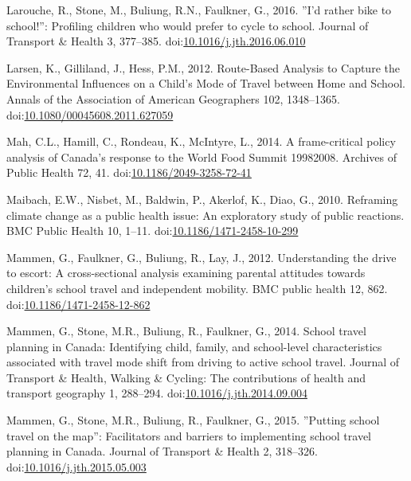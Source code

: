 \documentclass[]{elsarticle} %
\begin{document}
\leavevmode\hypertarget{ref-laroucheRatherBikeSchool2016}{}%
Larouche, R., Stone, M., Buliung, R.N., Faulkner, G., 2016. ''I'd rather
bike to school!'': Profiling children who would prefer to cycle to
school. Journal of Transport \& Health 3, 377--385.
doi:\href{https://doi.org/10.1016/j.jth.2016.06.010}{10.1016/j.jth.2016.06.010}

\leavevmode\hypertarget{ref-larsenRouteBasedAnalysisCapture2012}{}%
Larsen, K., Gilliland, J., Hess, P.M., 2012. Route-Based Analysis to
Capture the Environmental Influences on a Child's Mode of Travel between
Home and School. Annals of the Association of American Geographers 102,
1348--1365.
doi:\href{https://doi.org/10.1080/00045608.2011.627059}{10.1080/00045608.2011.627059}

\leavevmode\hypertarget{ref-mahFramecriticalPolicyAnalysis2014}{}%
Mah, C.L., Hamill, C., Rondeau, K., McIntyre, L., 2014. A frame-critical
policy analysis of Canada's response to the World Food Summit 19982008.
Archives of Public Health 72, 41.
doi:\href{https://doi.org/10.1186/2049-3258-72-41}{10.1186/2049-3258-72-41}

\leavevmode\hypertarget{ref-maibachReframingClimateChange2010}{}%
Maibach, E.W., Nisbet, M., Baldwin, P., Akerlof, K., Diao, G., 2010.
Reframing climate change as a public health issue: An exploratory study
of public reactions. BMC Public Health 10, 1--11.
doi:\href{https://doi.org/10.1186/1471-2458-10-299}{10.1186/1471-2458-10-299}

\leavevmode\hypertarget{ref-mammenUnderstandingDriveEscort2012}{}%
Mammen, G., Faulkner, G., Buliung, R., Lay, J., 2012. Understanding the
drive to escort: A cross-sectional analysis examining parental attitudes
towards children's school travel and independent mobility. BMC public
health 12, 862.
doi:\href{https://doi.org/10.1186/1471-2458-12-862}{10.1186/1471-2458-12-862}

\leavevmode\hypertarget{ref-mammenSchoolTravelPlanning2014}{}%
Mammen, G., Stone, M.R., Buliung, R., Faulkner, G., 2014. School travel
planning in Canada: Identifying child, family, and school-level
characteristics associated with travel mode shift from driving to active
school travel. Journal of Transport \& Health, Walking \& Cycling: The
contributions of health and transport geography 1, 288--294.
doi:\href{https://doi.org/10.1016/j.jth.2014.09.004}{10.1016/j.jth.2014.09.004}

\leavevmode\hypertarget{ref-mammenPuttingSchoolTravel2015}{}%
Mammen, G., Stone, M.R., Buliung, R., Faulkner, G., 2015. ''Putting
school travel on the map'': Facilitators and barriers to implementing
school travel planning in Canada. Journal of Transport \& Health 2,
318--326.
doi:\href{https://doi.org/10.1016/j.jth.2015.05.003}{10.1016/j.jth.2015.05.003}
\end{document}
